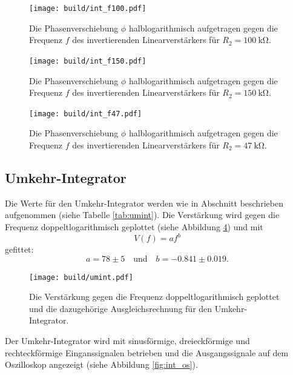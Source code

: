 \begin{figure}
    \centering
    \texttt{[image: build/int\_f100.pdf]}
    \caption{Die Phasenverschiebung $\phi$ halblogarithmisch aufgetragen gegen die Frequenz $f$
    des invertierenden Linearverstärkers für $R_2=\qty{100}{\kilo\ohm}$.}
    \label{fig:int100f}
\end{figure}
\begin{figure}
    \centering
    \texttt{[image: build/int\_f150.pdf]}
    \caption{Die Phasenverschiebung $\phi$ halblogarithmisch aufgetragen gegen die Frequenz $f$
    des invertierenden Linearverstärkers für $R_2=\qty{150}{\kilo\ohm}$.}
    \label{fig:int150f}
\end{figure}
\begin{figure}
    \centering
    \texttt{[image: build/int\_f47.pdf]}
    \caption{Die Phasenverschiebung $\phi$ halblogarithmisch aufgetragen gegen die Frequenz $f$
    des invertierenden Linearverstärkers für $R_2=\qty{47}{\kilo\ohm}$.}
    \label{fig:int47f}
\end{figure}
\FloatBarrier
\subsection{Umkehr-Integrator}
\label{sub:aus_int}
Die Werte für den Umkehr-Integrator werden wie in Abschnitt \label{sub:Um_Int} beschrieben aufgenommen
(siehe Tabelle \ref{tab:umint}).
\newline \newline
Die Verstärkung wird gegen die Frequenz doppeltlogarithmisch geplottet (siehe Abbildung \ref{fig:umint})
und mit 
\begin{equation*}
    V(f) = a f^b
\end{equation*}
\noindent gefittet:
\begin{equation}
    a= 78 \pm 5 \quad \text{und} \quad
    b = -0.841\pm 0.019.
\end{equation}

\begin{figure}
    \centering
    \texttt{[image: build/umint.pdf]}
    \caption{ Die Verstärkung gegen die Frequenz doppeltlogarithmisch geplottet 
    und die dazugehörige Ausgleichsrechnung für den Umkehr-Integrator.}
    \label{fig:umint}
\end{figure}
\FloatBarrier
\noindent Der Umkehr-Integrator wird mit sinusförmige,
dreieckförmige und rechteckförmige Einganssignalen betrieben und die Ausgangssignale auf dem Oszilloskop
angezeigt (siehe Abbildung \ref{fig:int_os}).

